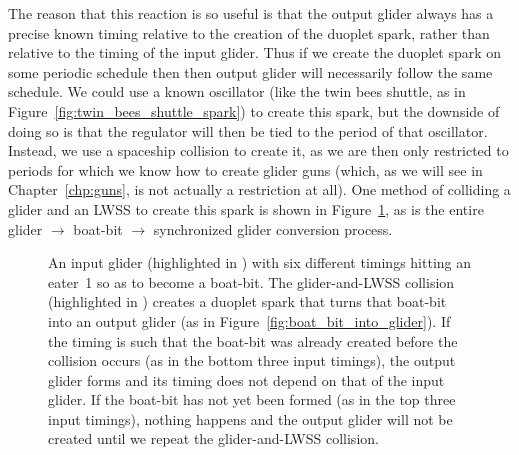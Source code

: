 The reason that this reaction is so useful is that the output glider always has a precise known timing relative to the creation of the duoplet spark, rather than relative to the timing of the input glider. Thus if we create the duoplet spark on some periodic schedule then then output glider will necessarily follow the same schedule. We could use a known oscillator (like the twin bees shuttle, as in Figure~\ref{fig:twin_bees_shuttle_spark}) to create this spark, but the downside of doing so is that the regulator will then be tied to the period of that oscillator. Instead, we use a spaceship collision to create it, as we are then only restricted to periods for which we know how to create glider guns (which, as we will see in Chapter~\ref{chp:guns}, is not actually a restriction at all). One method of colliding a glider and an LWSS to create this spark is shown in Figure~\ref{fig:make_sync_glider}, as is the entire glider $\rightarrow$ boat-bit $\rightarrow$ synchronized glider conversion process.

\begin{figure}[!htb]
	\centering
	\caption{An input glider (highlighted in ) with six different timings hitting an eater~1 so as to become a boat-bit. The glider-and-LWSS collision (highlighted in ) creates a duoplet spark that turns that boat-bit into an output glider (as in Figure~\ref{fig:boat_bit_into_glider}). If the timing is such that the boat-bit was already created before the collision occurs (as in the bottom three input timings), the output glider forms and its timing does not depend on that of the input glider. If the boat-bit has not yet been formed (as in the top three input timings), nothing happens and the output glider will not be created until we repeat the glider-and-LWSS collision.}\label{fig:make_sync_glider}
\end{figure}


